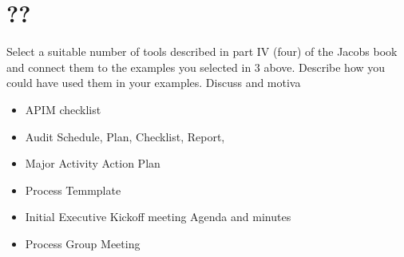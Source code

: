
\section{??}
Select a suitable number of tools described in part IV (four) of the Jacobs book and connect them to the examples you selected in 3 above. Describe how you could have used them in your examples. Discuss and motiva

\begin{itemize}
\item APIM checklist
\item Audit Schedule, Plan, Checklist, Report,
\item Major Activity Action Plan
\item Process Temmplate
\item Initial Executive Kickoff meeting Agenda and minutes
\item Process Group Meeting 
\end{itemize}